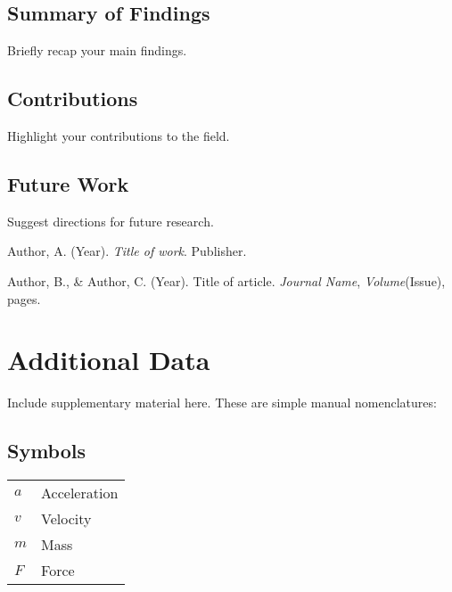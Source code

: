\section{Summary of Findings}

Briefly recap your main findings.

\section{Contributions}

Highlight your contributions to the field.

\section{Future Work}

Suggest directions for future research.

\begin{thebibliography}{99}
    
    Author, A. (Year). \textit{Title of work}. Publisher.
    
    Author, B., \& Author, C. (Year). Title of article. \textit{Journal Name}, \textit{Volume}(Issue), pages.
    
    
\end{thebibliography}

\appendix	

\chapter{Additional Data}

Include supplementary material here. These are simple manual nomenclatures:

\section*{Symbols}
\begin{tabular}{ll}
$a$ & Acceleration \\
$v$ & Velocity \\
$m$ & Mass \\
$F$ & Force \\
\end{tabular}

